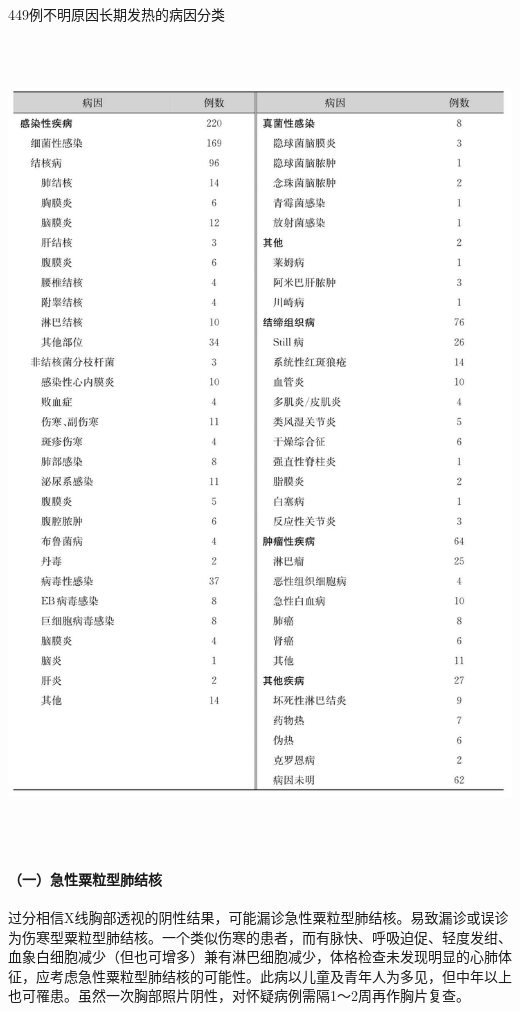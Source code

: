 \begin{table}[htbp]
\centering
\caption{449例不明原因长期发热的病因分类}
\label{tab2-18}
\includegraphics[width=5.97917in,height=8.40625in]{./images/Image00024.jpg}
\end{table}

\paragraph{（一）急性粟粒型肺结核}

过分相信X线胸部透视的阴性结果，可能漏诊急性粟粒型肺结核。易致漏诊或误诊为伤寒型粟粒型肺结核。一个类似伤寒的患者，而有脉快、呼吸迫促、轻度发绀、血象白细胞减少（但也可增多）兼有淋巴细胞减少，体格检查未发现明显的心肺体征，应考虑急性粟粒型肺结核的可能性。此病以儿童及青年人为多见，但中年以上也可罹患。虽然一次胸部照片阴性，对怀疑病例需隔1～2周再作胸片复查。

